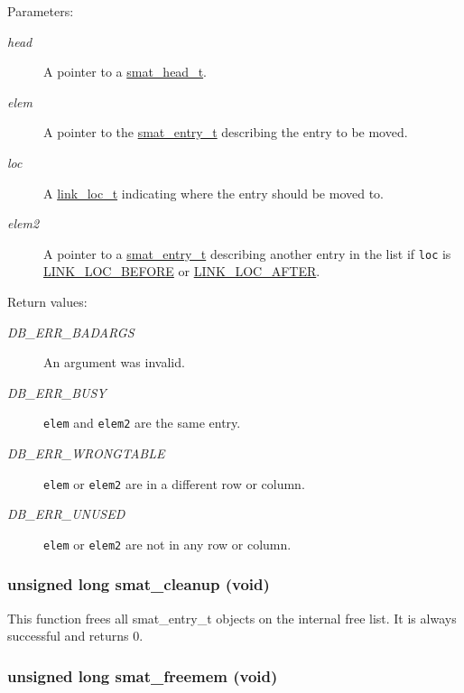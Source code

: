 \begin{Desc}
\item[Parameters:]
\begin{description}
\item[{\em head}]A pointer to a \hyperlink{group__dbprim__smat_a1}{smat\_\-head\_\-t}. \item[{\em elem}]A pointer to the \hyperlink{group__dbprim__smat_a2}{smat\_\-entry\_\-t} describing the entry to be moved. \item[{\em loc}]A \hyperlink{group__dbprim__link_a4}{link\_\-loc\_\-t} indicating where the entry should be moved to. \item[{\em elem2}]A pointer to a \hyperlink{group__dbprim__smat_a2}{smat\_\-entry\_\-t} describing another entry in the list if {\tt loc} is \hyperlink{group__dbprim__link_a26a133}{LINK\_\-LOC\_\-BEFORE} or \hyperlink{group__dbprim__link_a26a134}{LINK\_\-LOC\_\-AFTER}.\end{description}
\end{Desc}
\begin{Desc}
\item[Return values:]
\begin{description}
\item[{\em DB\_\-ERR\_\-BADARGS}]An argument was invalid. \item[{\em DB\_\-ERR\_\-BUSY}]{\tt elem} and {\tt elem2} are the same entry. \item[{\em DB\_\-ERR\_\-WRONGTABLE}]{\tt elem} or {\tt elem2} are in a different row or column. \item[{\em DB\_\-ERR\_\-UNUSED}]{\tt elem} or {\tt elem2} are not in any row or column. \end{description}
\end{Desc}
\hypertarget{group__dbprim__smat_a7}{
\subsubsection[smat\_\-cleanup]{\setlength{\rightskip}{0pt plus 5cm}unsigned long smat\_\-cleanup (void)}}
\label{group__dbprim__smat_a7}


This function frees all smat\_\-entry\_\-t objects on the internal free list. It is always successful and returns 0. \hypertarget{group__dbprim__smat_a8}{
\subsubsection[smat\_\-freemem]{\setlength{\rightskip}{0pt plus 5cm}unsigned long smat\_\-freemem (void)}}
\label{group__dbprim__smat_a8}


